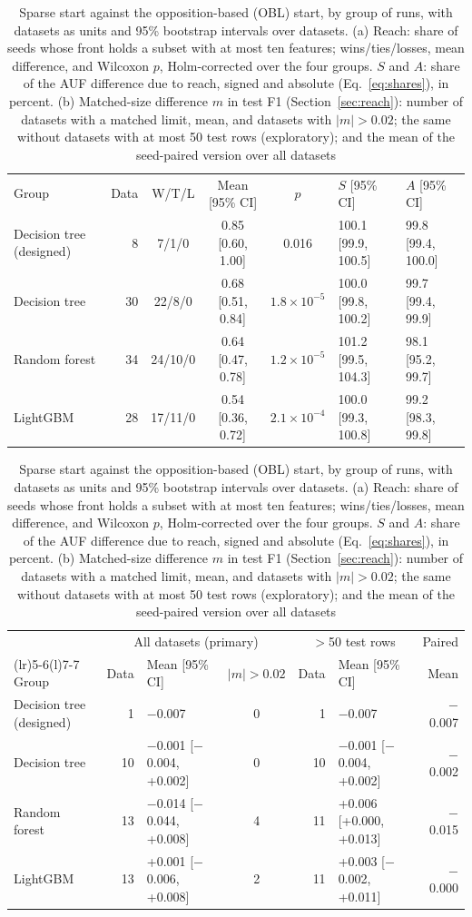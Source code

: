 \begin{table}[!tbp]
\caption{Sparse start against the opposition-based (OBL) start, by group of runs, with datasets as units and 95\% bootstrap intervals over datasets. (a) Reach: share of seeds whose front holds a subset with at most ten features; wins/ties/losses, mean difference, and Wilcoxon $p$, Holm-corrected over the four groups. $S$ and $A$: share of the AUF difference due to reach, signed and absolute (Eq.~\ref{eq:shares}), in percent. (b) Matched-size difference $m$ in test F1 (Section~\ref{sec:reach}): number of datasets with a matched limit, mean, and datasets with $|m| > 0.02$; the same without datasets with at most 50 test rows (exploratory); and the mean of the seed-paired version over all datasets}
\label{tab:criterion}
\centering
\footnotesize
\setlength{\tabcolsep}{2.6pt}
\begin{tabular}{@{}>{\raggedright\arraybackslash}p{17mm}rcccll@{}}
\multicolumn{7}{@{}l}{(a) Reach and its share of the AUF difference} \\
\toprule
Group & Data & W/T/L & Mean [95\% CI] & $p$ & $S$ [95\% CI] & $A$ [95\% CI] \\
\midrule
Decision tree (designed) & 8 & 7/1/0 & 0.85 [0.60, 1.00] & 0.016 & 100.1 [99.9, 100.5] & 99.8 [99.4, 100.0] \\
Decision tree & 30 & 22/8/0 & 0.68 [0.51, 0.84] & $1.8\times10^{-5}$ & 100.0 [99.8, 100.2] & 99.7 [99.4, 99.9] \\
Random forest & 34 & 24/10/0 & 0.64 [0.47, 0.78] & $1.2\times10^{-5}$ & 101.2 [99.5, 104.3] & 98.1 [95.2, 99.7] \\
LightGBM & 28 & 17/11/0 & 0.54 [0.36, 0.72] & $2.1\times10^{-4}$ & 100.0 [99.3, 100.8] & 99.2 [98.3, 99.8] \\
\bottomrule
\end{tabular}

\medskip
\begin{tabular}{@{}>{\raggedright\arraybackslash}p{17mm}rlcrlr@{}}
\multicolumn{7}{@{}l}{(b) Test F1 at matched sizes, sparse minus OBL start} \\
\toprule
 & \multicolumn{3}{c}{All datasets (primary)} & \multicolumn{2}{c}{$>$50 test rows} & Paired \\
\cmidrule(lr){2-4}\cmidrule(lr){5-6}\cmidrule(l){7-7}
Group & Data & Mean [95\% CI] & $|m|{>}0.02$ & Data & Mean [95\% CI] & Mean \\
\midrule
Decision tree (designed) & 1 & $-$0.007 & 0 & 1 & $-$0.007 & $-$0.007 \\
Decision tree & 10 & $-$0.001 [$-$0.004, +0.002] & 0 & 10 & $-$0.001 [$-$0.004, +0.002] & $-$0.002 \\
Random forest & 13 & $-$0.014 [$-$0.044, +0.008] & 4 & 11 & +0.006 [+0.000, +0.013] & $-$0.015 \\
LightGBM & 13 & +0.001 [$-$0.006, +0.008] & 2 & 11 & +0.003 [$-$0.002, +0.011] & $-$0.000 \\
\bottomrule
\end{tabular}
\end{table}
